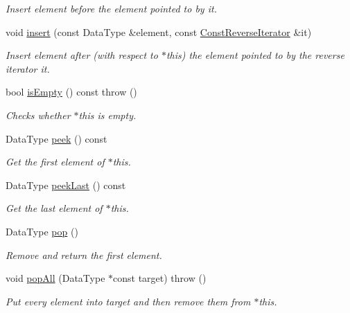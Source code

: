 \begin{DoxyCompactItemize}
\begin{DoxyCompactList}\small\item\em Insert {\ttfamily element} before the element pointed to by {\ttfamily it}. \end{DoxyCompactList}\item 
void \hyperlink{classVectorDeque_a2fac11287907b1e659602e834e402141}{insert} (const Data\-Type \&element, const \hyperlink{classVectorDeque_a291aa5e53d483276367327acb93f3846}{Const\-Reverse\-Iterator} \&it)
\begin{DoxyCompactList}\small\item\em Insert {\ttfamily element} after (with respect to {\ttfamily $\ast$this}) the element pointed to by the reverse iterator {\ttfamily it}. \end{DoxyCompactList}\item 
bool \hyperlink{classVectorDeque_a2276eec2f96514a9f715f2c7baeb9f85}{is\-Empty} () const   throw ()
\begin{DoxyCompactList}\small\item\em Checks whether {\ttfamily $\ast$this} is empty. \end{DoxyCompactList}\item 
Data\-Type \hyperlink{classVectorDeque_a422235687c4f419d99f6a542bdf9b0e1}{peek} () const 
\begin{DoxyCompactList}\small\item\em Get the first element of {\ttfamily $\ast$this}. \end{DoxyCompactList}\item 
Data\-Type \hyperlink{classVectorDeque_ae2901d12f640144868d9c3aaee93609f}{peek\-Last} () const 
\begin{DoxyCompactList}\small\item\em Get the last element of {\ttfamily $\ast$this}. \end{DoxyCompactList}\item 
Data\-Type \hyperlink{classVectorDeque_a2c64607e5255a154d4e0e781a9f4cbca}{pop} ()
\begin{DoxyCompactList}\small\item\em Remove and return the first element. \end{DoxyCompactList}\item 
void \hyperlink{classVectorDeque_ab5d37b26fef424fc1c7799bded9d0fd6}{pop\-All} (Data\-Type $\ast$const target)  throw ()
\begin{DoxyCompactList}\small\item\em Put every element into {\ttfamily target} and then remove them from {\ttfamily $\ast$this}. \end{DoxyCompactList}\item 

\end{DoxyCompactItemize}
